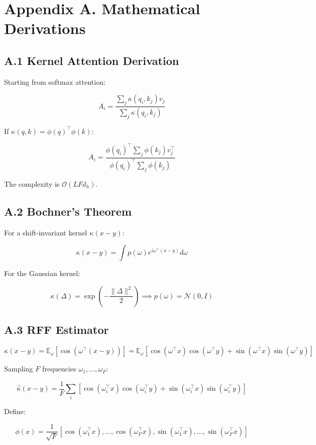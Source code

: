 \section{Appendix A. Mathematical Derivations}

\subsection{A.1 Kernel Attention Derivation}

Starting from softmax attention:

\[
A_i = \frac{\sum_j \kappa(q_i, k_j) v_j}{\sum_j \kappa(q_i, k_j)}
\tag{A.1}
\]

If $\kappa(q, k) = \phi(q)^\top \phi(k)$:

\[
A_i = \frac{\phi(q_i)^\top \sum_j \phi(k_j) v_j^\top}{\phi(q_i)^\top \sum_j \phi(k_j)}
\tag{A.2}
\]

The complexity is $\mathcal{O}(L F d_h)$.

\subsection{A.2 Bochner's Theorem}

For a shift-invariant kernel $\kappa(x - y)$:

\[
\kappa(x - y) = \int p(\omega) e^{i \omega^\top (x - y)} d\omega
\tag{A.3}
\]

For the Gaussian kernel:

\[
\kappa(\Delta) = \exp\!\left(-\frac{\|\Delta\|^2}{2}\right) \implies p(\omega) = \mathcal{N}(0, I)
\tag{A.4}
\]

\subsection{A.3 RFF Estimator}

\[
\kappa(x - y) = \mathbb{E}_\omega[\cos(\omega^\top (x - y))] = \mathbb{E}_\omega[\cos(\omega^\top x) \cos(\omega^\top y) + \sin(\omega^\top x) \sin(\omega^\top y)]
\tag{A.5}
\]

Sampling $F$ frequencies $\omega_1, \dots, \omega_F$:

\[
\hat{\kappa}(x - y) = \frac{1}{F} \sum_i [\cos(\omega_i^\top x) \cos(\omega_i^\top y) + \sin(\omega_i^\top x) \sin(\omega_i^\top y)]
\tag{A.6}
\]

Define:

\[
\phi(x) = \frac{1}{\sqrt{F}} [\cos(\omega_1^\top x), \dots, \cos(\omega_F^\top x), \sin(\omega_1^\top x), \dots, \sin(\omega_F^\top x)]
\tag{A.7}
\]

